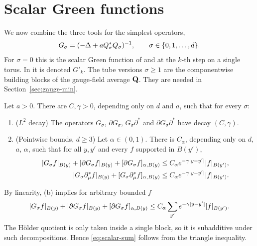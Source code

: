 \section{Scalar Green functions}\label{sec:scalar}

We now combine the three tools for the simplest operators,
\[
G_\sigma=(-\Delta+aQ_\sigma^*Q_\sigma)^{-1},\qquad\sigma\in\{0,1,\dots,d\}.
\]
For $\sigma=0$ this is the scalar Green function of \cite{BalGreen} and \cite{DST1} at the $k$-th step on a single torus. In \cite{BalPropI} it is denoted $G'_k$. The tube versions $\sigma\ge1$ are the componentwise building blocks of the gauge-field average $\mathbf Q$. They are needed in Section~\ref{sec:gauge-min}.

\begin{theorem}\label{thm:scalar-green}
Let $a>0$. There are $C,\gamma>0$, depending only on $d$ and $a$, such that for every $\sigma$:
\begin{enumerate}[label=(\alph*)]
\item ($L^2$ decay) The operators $G_\sigma$, $\partial G_\sigma$, $G_\sigma\partial^*$ and $\partial G_\sigma\partial^*$ have decay $(C,\gamma)$.
\item (Pointwise bounds, $d\ge3$) Let $\alpha\in(0,1)$. There is $C_\alpha$, depending only on $d$, $a$, $\alpha$, such that for all $y,y'$ and every $f$ supported in $B(y')$,
\begin{align*}
|G_\sigma f|_{B(y)}+|\partial G_\sigma f|_{B(y)}+[\partial G_\sigma f]_{\alpha,B(y)}&\le C_\alpha e^{-\gamma|y-y'|}|f|_{B(y')},\\
|G_\sigma\partial^*_\mu f|_{B(y)}+[G_\sigma\partial^*_\mu f]_{\alpha,B(y)}&\le C_\alpha e^{-\gamma|y-y'|}|f|_{B(y')}.
\end{align*}
\end{enumerate}
\end{theorem}

By linearity, (b) implies for arbitrary bounded $f$
\begin{equation}\label{eq:scalar-sum}
|G_\sigma f|_{B(y)}+|\partial G_\sigma f|_{B(y)}+[\partial G_\sigma f]_{\alpha,B(y)}\le C_\alpha\sum_{y'}e^{-\gamma|y-y'|}|f|_{B(y')}.
\end{equation}
The H\"older quotient is only taken inside a single block, so it is subadditive under such decompositions. Hence \eqref{eq:scalar-sum} follows from the triangle inequality.

